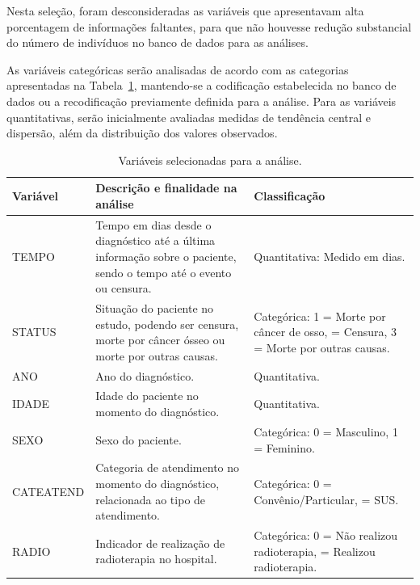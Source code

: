 \documentclass[11pt,a4paper]{article}
\begin{document}
Nesta seleção, foram desconsideradas as variáveis que apresentavam alta porcentagem de informações faltantes, para que não houvesse redução substancial do número de indivíduos no banco de dados para as análises.

As variáveis categóricas serão analisadas de acordo com as categorias apresentadas na Tabela~\ref{tab:variaveis}, mantendo-se a codificação estabelecida no banco de dados ou a recodificação previamente definida para a análise. Para as variáveis quantitativas, serão inicialmente avaliadas medidas de tendência central e dispersão, além da distribuição dos valores observados. 


\begin{table}[H]
\centering
\small
\caption{Variáveis selecionadas para a análise.}
\label{tab:variaveis}
\begin{tabularx}{\textwidth}{
    >{\ttfamily}l
    >{\raggedright\arraybackslash}X
    >{\raggedright\arraybackslash}X
}
\toprule
\textnormal{Variável} & \textnormal{Descrição e finalidade na análise} & \textnormal{Classificação} \\
\midrule
TEMPO &
Tempo em dias desde o diagnóstico até a última informação sobre o paciente, sendo o tempo até o
evento ou censura. & Quantitativa: Medido em dias. \\

STATUS &
Situação do paciente no estudo, podendo ser censura,
morte por câncer ósseo ou morte por outras causas. & Categórica: 1 = Morte por câncer de osso, \newline 2 = Censura, 3 = Morte por outras causas.\\

ANO &
Ano do diagnóstico. & Quantitativa. \\

IDADE &
Idade do paciente no momento do diagnóstico. & Quantitativa. \\

SEXO &
Sexo do paciente. & Categórica: 0 = Masculino, 1 = Feminino.  \\

CATEATEND &
Categoria de atendimento no momento do diagnóstico, relacionada ao tipo de
atendimento. &  Categórica: 0 = Convênio/Particular,\newline 1 = SUS. \\

RADIO &
Indicador de realização de radioterapia no hospital. & Categórica: 0 = Não realizou radioterapia, \newline1 = Realizou radioterapia. \\


\end{tabularx}
\end{table}
\end{document}
